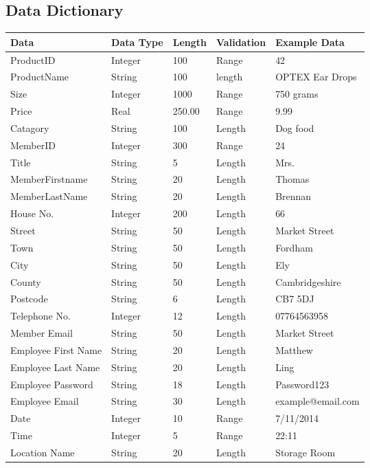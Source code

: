 \subsection{Data Dictionary}

    \begin{tabular}{|p{3cm}|p{2cm}|p{1.2cm}|p{2cm}|p{3cm}|}
        \hline
        \textbf{Data} & \textbf{Data Type} & \textbf{Length} & \textbf{Validation} & \textbf{Example Data}\\ \hline
	ProductID & Integer & 100 & Range & 42 \\ \hline
	ProductName & String & 100 & length & OPTEX Ear Drops \\ \hline
	Size & Integer & 1000 & Range & 750 grams \\ \hline
          Price & Real & 250.00 & Range & 9.99 \\ \hline
          Catagory & String & 100 & Length & Dog food \\ \hline
          MemberID & Integer & 300 & Range & 24 \\ \hline
	Title & String & 5 & Length & Mrs. \\ \hline
          MemberFirstname & String & 20 & Length & Thomas \\ \hline
          MemberLastName & String & 20 & Length & Brennan \\ \hline
          House No. & Integer & 200 & Length & 66 \\ \hline
	Street & String & 50 & Length & Market Street \\ \hline
	Town & String & 50 & Length & Fordham \\ \hline
         City & String & 50 & Length & Ely \\ \hline
         County & String & 50 & Length & Cambridgeshire \\ \hline
         Postcode & String & 6 & Length & CB7 5DJ \\ \hline
         Telephone No. & Integer & 12 & Length & 07764563958 \\ \hline
	Member Email & String & 50 & Length & Market Street \\ \hline
	Employee First Name & String & 20 & Length & Matthew \\ \hline
	Employee Last Name & String & 20 & Length & Ling \\ \hline
	Employee Password & String & 18 & Length & Password123 \\ \hline
	Employee Email & String & 30 & Length & example@email.com \\ \hline
	Date & Integer & 10 & Range & 7/11/2014 \\ \hline
	Time & Integer & 5 & Range & 22:11 \\ \hline
	Location Name & String & 20 & Length & Storage Room \\ \hline
  \end{tabular}

